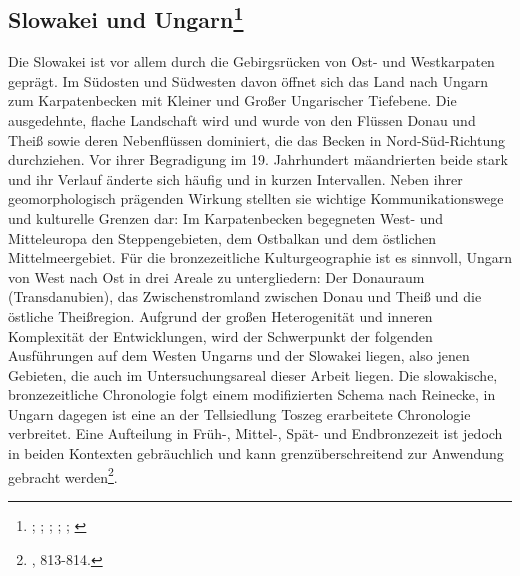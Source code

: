 \documentclass[openany,twoside,twocolumn]{book}
\let\rmarkdownfootnote\footnote%
\def\footnote{\protect\rmarkdownfootnote}
\begin{document}
\hypertarget{slowakei-und-ungarn}{%
\subsection[Slowakei und Ungarn]{\texorpdfstring{Slowakei und
Ungarn\footnote{\textcite{furmanek_bronzezeit_1999};
  \textcite{kemenczei_spatbronzezeit_1984};
  \textcite{lochner_bestattungssitten_2013};
  \textcite{markova_slovakia_2013}; \textcite{sorensen_landscapes_2008};
  \textcite{vicze_bestattungen_1992}}}{Slowakei und Ungarn}}\label{slowakei-und-ungarn}}

Die Slowakei ist vor allem durch die Gebirgsrücken von Ost- und
Westkarpaten geprägt. Im Südosten und Südwesten davon öffnet sich das
Land nach Ungarn zum Karpatenbecken mit Kleiner und Großer Ungarischer
Tiefebene. Die ausgedehnte, flache Landschaft wird und wurde von den
Flüssen Donau und Theiß sowie deren Nebenflüssen dominiert, die das
Becken in Nord-Süd-Richtung durchziehen. Vor ihrer Begradigung im 19.
Jahrhundert mäandrierten beide stark und ihr Verlauf änderte sich häufig
und in kurzen Intervallen. Neben ihrer geomorphologisch prägenden
Wirkung stellten sie wichtige Kommunikationswege und kulturelle Grenzen
dar: Im Karpatenbecken begegneten West- und Mitteleuropa den
Steppengebieten, dem Ostbalkan und dem östlichen Mittelmeergebiet. Für
die bronzezeitliche Kulturgeographie ist es sinnvoll, Ungarn von West
nach Ost in drei Areale zu untergliedern: Der Donauraum (Transdanubien),
das Zwischenstromland zwischen Donau und Theiß und die östliche
Theißregion. Aufgrund der großen Heterogenität und inneren Komplexität
der Entwicklungen, wird der Schwerpunkt der folgenden Ausführungen auf
dem Westen Ungarns und der Slowakei liegen, also jenen Gebieten, die
auch im Untersuchungsareal dieser Arbeit liegen. Die slowakische,
bronzezeitliche Chronologie folgt einem modifizierten Schema nach
Reinecke, in Ungarn dagegen ist eine an der Tellsiedlung Toszeg
erarbeitete Chronologie verbreitet. Eine Aufteilung in Früh-, Mittel-,
Spät- und Endbronzezeit ist jedoch in beiden Kontexten gebräuchlich und
kann grenzüberschreitend zur Anwendung gebracht werden\footnote{\textcite{markova_slovakia_2013},
  813-814.}.
\end{document}
